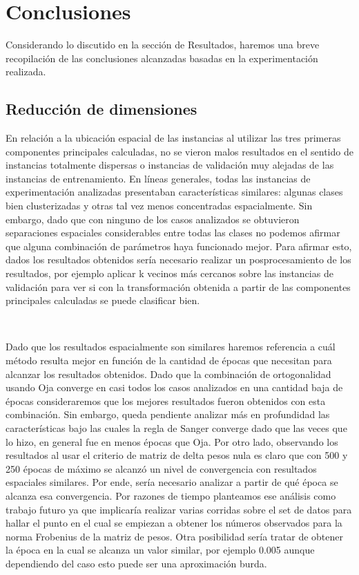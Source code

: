 \documentclass[informe.tex]{subfiles}
\begin{document}
  
  \section{Conclusiones}
  
  Considerando lo discutido en la sección de Resultados, haremos una breve recopilación de las conclusiones alcanzadas basadas en la experimentación realizada. 

    \subsection{Reducción de dimensiones}
      
      En relación a la ubicación espacial de las instancias al utilizar las tres primeras componentes principales calculadas, no se vieron malos resultados en el sentido de instancias totalmente dispersas o instancias de validación muy alejadas de las instancias de entrenamiento. En líneas generales, todas las instancias de experimentación analizadas presentaban características similares: algunas clases bien clusterizadas y otras tal vez menos concentradas espacialmente. Sin embargo, dado que con ninguno de los casos analizados se obtuvieron separaciones espaciales considerables entre todas las clases no podemos afirmar que alguna combinación de parámetros haya funcionado mejor. Para afirmar esto, dados los resultados obtenidos sería necesario realizar un posprocesamiento de los resultados, por ejemplo aplicar k vecinos más cercanos sobre las instancias de validación para ver si con la transformación obtenida a partir de las componentes principales calculadas se puede clasificar bien.
      
      ~
      
      Dado que los resultados espacialmente son similares haremos referencia a cu\'al m\'etodo resulta mejor en funci\'on de la cantidad de \'epocas que necesitan para alcanzar los resultados obtenidos. Dado que la combinación de ortogonalidad usando Oja converge en casi todos los casos analizados en una cantidad baja de épocas consideraremos que los mejores resultados fueron obtenidos con esta combinación. Sin embargo, queda pendiente analizar más en profundidad las características bajo las cuales la regla de Sanger converge dado que las veces que lo hizo, en general fue en menos épocas que Oja. Por otro lado, observando los resultados al usar el criterio de matriz de delta pesos nula es claro que con 500 y 250 \'epocas de máximo se alcanzó un nivel de convergencia con resultados espaciales similares. Por ende, sería necesario analizar a partir de qué época se alcanza esa convergencia. Por razones de tiempo planteamos ese análisis como trabajo futuro ya que implicaría realizar varias corridas sobre el set de datos para hallar el punto en el cual se empiezan a obtener los números observados para la norma Frobenius de la matriz de pesos. Otra posibilidad sería tratar de obtener la época en la cual se alcanza un valor similar, por ejemplo 0.005 aunque dependiendo del caso esto puede ser una aproximación burda.
      
\end{document}
